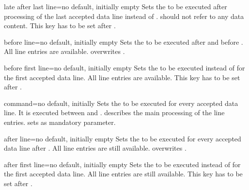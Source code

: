 \documentclass[a4paper,11pt]{ltxdoc}
\begin{document}
\begin{docCsvKey}{late after last line}{=}{no default, initially empty}
  Sets the  to be executed after processing of the last
  accepted data line instead of .
   should not refer to any data content.
  This key has to be set after .
\end{docCsvKey}


\begin{docCsvKey}{before line}{=}{no default, initially empty}
  Sets the  to be executed after 
  and before .
  All line entries are available.
   overwrites
  .
\end{docCsvKey}


\begin{docCsvKey}{before first line}{=}{no default, initially empty}
  Sets the  to be executed instead of 
  for the first accepted data line.
  All line entries are available.
  This key has to be set after .
\end{docCsvKey}

\pagebreak

\begin{docCsvKey}{command}{=}{no default, initially }
  Sets the  to be executed for every accepted data line.
  It is executed between  and .
   describes the main processing of the line
  entries.  sets  as mandatory
  parameter.
\end{docCsvKey}

\begin{docCsvKey}{after line}{=}{no default, initially empty}
  Sets the  to be executed for every accepted data line
  after .
  All line entries are still available.
   overwrites .
\end{docCsvKey}


\begin{docCsvKey}{after first line}{=}{no default, initially empty}
  Sets the  to be executed instead of 
  for the first accepted data line.
  All line entries are still available.
  This key has to be set after .
\end{docCsvKey}
\end{document}
